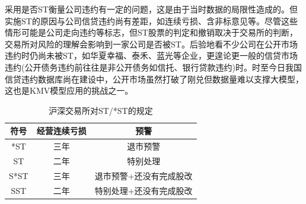 \documentclass[a4paper,12pt]{ctexart}
\begin{document}
采用是否ST衡量公司违约有一定的问题，这是由于当时数据的局限性造成的。但实施ST的原因与公司信贷违约尚有差距，如连续亏损、含非标意见等。尽管这些情形可能是公司走向违约等标志，但ST股票的判定和撤销取决于交易所的判断，交易所对风险的理解会影响到一家公司是否被ST。后验地看不少公司在公开市场违约时仍尚未被ST，如华夏幸福、泰禾、蓝光等企业，更遑论更一般的信贷市场违约(公开债务违约前往往是非公开债务如信托、银行贷款违约)时。时至今日我国信贷违约数据库尚在建设中，公开市场虽然打破了刚兑但数据量难以支撑大模型，这也是KMV模型应用的挑战之一。
\begin{table}[H]
    \centering
    \begin{tabular}{|c|c|c|}
        \hline
        符号   & 经营连续亏损 & 预警           \\\hline
        *ST  & 三年     & 退市预警         \\
        ST   & 二年     & 特别处理         \\
        S*ST & 三年     & 退市预警+还没有完成股改 \\
        SST  & 二年     & 特别处理+还没有完成股改 \\
        \hline
    \end{tabular}
    \caption{沪深交易所对ST/*ST的规定}
\end{table}
\end{document}
